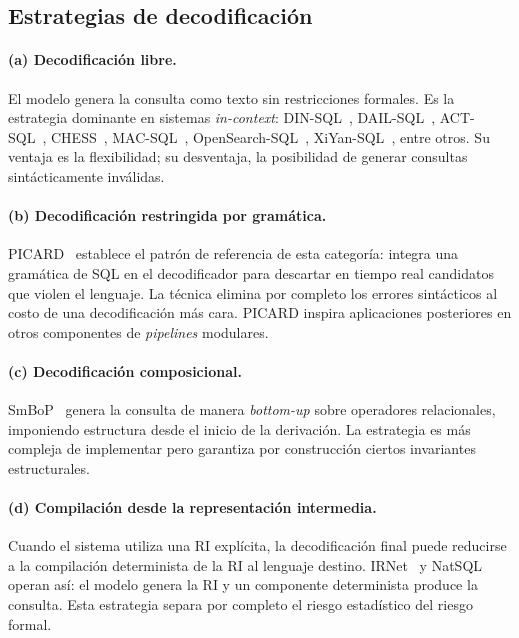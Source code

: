 \subsection{Estrategias de decodificación}
\label{subsec:sota-d3c-decoding}

\paragraph{(a) Decodificación libre.} El modelo genera la consulta como
texto sin restricciones formales. Es la estrategia dominante en sistemas
\emph{in-context}: DIN-SQL~\cite{DIN-SQL2023}, DAIL-SQL~\cite{DAIL-SQL2023},
ACT-SQL~\cite{ACT-SQL2023}, CHESS~\cite{CHESS2024},
MAC-SQL~\cite{MAC-SQL2023}, OpenSearch-SQL~\cite{OpenSearch-SQL2025},
XiYan-SQL~\cite{XiYan-SQL2024}, entre otros. Su ventaja es la
flexibilidad; su desventaja, la posibilidad de generar consultas
sintácticamente inválidas.

\paragraph{(b) Decodificación restringida por gramática.}
PICARD~\cite{PICARD2022} establece el patrón de referencia de esta
categoría: integra una gramática de SQL en el decodificador para
descartar en tiempo real candidatos que violen el lenguaje. La técnica
elimina por completo los errores sintácticos al costo de una
decodificación más cara. PICARD inspira aplicaciones posteriores en
otros componentes de \emph{pipelines} modulares.

\paragraph{(c) Decodificación composicional.} SmBoP~\cite{SmBoP2021}
genera la consulta de manera \emph{bottom-up} sobre operadores
relacionales, imponiendo estructura desde el inicio de la derivación.
La estrategia es más compleja de implementar pero garantiza por
construcción ciertos invariantes estructurales.

\paragraph{(d) Compilación desde la representación intermedia.} Cuando
el sistema utiliza una RI explícita, la decodificación final puede
reducirse a la compilación determinista de la RI al lenguaje destino.
IRNet~\cite{guo2019irnet} y NatSQL~\cite{gan2021natsql}
operan así: el modelo genera la RI y un componente determinista produce
la consulta. Esta estrategia separa por completo el riesgo estadístico
del riesgo formal.

